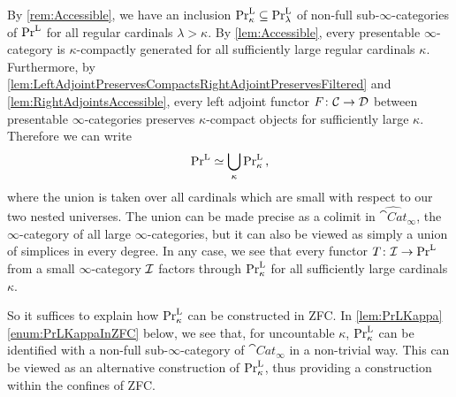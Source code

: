 \begin{numpar}\label{par:PrLInZFC}
	By \cref{rem:Accessible}, we have an inclusion $\mathrm{Pr}_\kappa^{\mathrm{L}}\subseteq \mathrm{Pr}_\lambda^{\mathrm{L}}$ of non-full sub-$\infty$-categories of $\mathrm{Pr}^{\mathrm{L}}$ for all regular cardinals $\lambda>\kappa$. By \cref{lem:Accessible}, every presentable $\infty$-category is $\kappa$-compactly generated for all sufficiently large regular cardinals $\kappa$. Furthermore, by \cref{lem:LeftAdjointPreservesCompactsRightAdjointPreservesFiltered} and \cref{lem:RightAdjointsAccessible}, every left adjoint functor $F\colon \mathcal{C}\rightarrow \mathcal{D}$ between presentable $\infty$-categories preserves $\kappa$-compact objects for sufficiently large $\kappa$. Therefore we can write
	\begin{equation*}
		\mathrm{Pr}^{\mathrm{L}}\simeq \bigcup_{\kappa}\mathrm{Pr}^{\mathrm{L}}_\kappa\,,
	\end{equation*}
	where the union is taken over all cardinals which are small with respect to our two nested universes. The union can be made precise as a colimit in $\widehat{\cat{Cat}}_\infty$, the $\infty$-category of all large $\infty$-categories, but it can also be viewed as simply a union of simplices in every degree.  In any case, we see that every functor $T\colon \mathcal{I}\rightarrow \mathrm{Pr}^{\mathrm{L}}$ from a small $\infty$-category $\mathcal{I}$ factors through $\mathrm{Pr}_\kappa^{\mathrm{L}}$ for all sufficiently large cardinals $\kappa$.
	
	So it suffices to explain how $\mathrm{Pr}_\kappa^{\mathrm{L}}$ can be constructed in ZFC. In \cref{lem:PrLKappa}\cref{enum:PrLKappaInZFC} below, we see that, for uncountable $\kappa$, $\mathrm{Pr}_\kappa^{\mathrm{L}}$ can be identified with a non-full sub-$\infty$-category of $\cat{Cat}_\infty$ in a non-trivial way. This can be viewed as an alternative construction of $\mathrm{Pr}_\kappa^{\mathrm{L}}$, thus providing a construction within the confines of ZFC.
\end{numpar}
